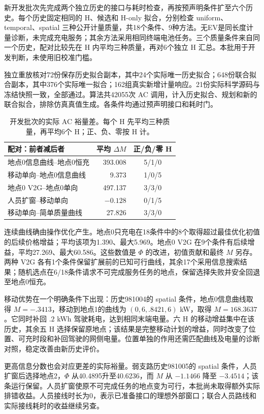 \documentclass[UTF8,fontset=fandol,11pt,a4paper]{ctexart}
\begin{document}
新开发批次先完成两个独立历史的接口与耗时检查，再按预声明条件扩至六个历史。每个历史固定相同的 H、候选和 H-only 拟合，分别检查 uniform、temporal、spatial 三种公开计量质量，共18个条件、9种方法。无EV是同长度计量诊断，未完成充电服务；其余方法采用相同终端电池任务。三个质量条件来自同一个历史，配对比较先在 H 内平均三种质量，再对6个独立 H 汇总。本批用于开发判断，未使用旧校准门槛。

独立重放核对72份保存历史拟合副本，其中24个实际唯一历史拟合；648份联合拟合副本，其中376个实际唯一拟合；162组真实新增计量响应。21份实际科学源码与冻结快照一致，全部通过。算法共42055次 AC 调用，计入历史拟合、规划和新的联合拟合，排除仿真真值生成。各条件均通过预声明接口和耗时门。

\begin{table}[htbp]
 \centering\small
 \caption{开发批次的实际 AC 裕量差。每个 H 先平均三种质量，再平均6个 H；正、负、零按 H 计。}
 \label{evf:development-pairs}
 \begin{tabular}{lrc}
  \toprule
  配对：前者减后者 & 平均 $\Delta M$ & 正/负/零 H\\
  \midrule
  地点0信息曲线--地点0恒充 & 393.008 & 5/1/0\\
  移动单向--地点0信息曲线 & 9.373 & 1/0/5\\
  地点0 V2G--地点0单向 & 497.137 & 3/3/0\\
  人员扩窗--移动单向 & $-0.128$ & 0/1/5\\
  移动单向--简单质量曲线 & 27.826 & 3/3/0\\
  \bottomrule
 \end{tabular}
\end{table}

连续曲线确由操作优化产生。地点0只充电在18条件中的8个取得超过最佳优化初值的后续价格增益；平均该项为1.390、最大5.969。地点0 V2G 在9个条件有后续增益，平均27.269、最大60.586。这些数值是 $\Phi$ 的改进，初值贡献和最终 $M$ 另存。两种 V2G 各有1个条件保留扩展前的已知可行曲线，其余17个采用信息搜索结果；随机选点在6/18条件请求不可完成服务任务的地点，保留选择失败并安全回退至地点0恒充。

移动优势在一个明确条件下出现：历史981004的 spatial 条件，地点0信息曲线取得 $M=-.3413$，移动到地点1的曲线为 $(0,6,.8421,6)$ kW，取得 $M=168.3637$。它同时补回 $.2$ kWh 驾驶耗电，达到相同末端电量。六 H 的移动增益集中在该历史，其余五 H 选择保留原地点；该结果是完整移动计划的增益，同时改变了位置、可充时段和补回驾驶的网侧电量。位置单独的作用还需匹配曲线及电量的诊断对照，稳定改善由新历史评价。

更高信息分数也会对应更差的实际裕量。弱支路历史981005的 spatial 条件，人员扩窗后选择地点2，$\Phi$ 从40.4895升至40.6236，而 $M$ 从 $-1.1466$ 降至 $-3.4514$；该条运行保留。人员扩窗使原不可完成任务的地点变为可行，本批尚未取得额外实际排错收益。人员接线时长为0，表示已准备接口的理想外部窗口；联合人员路线和实际接线耗时的收益继续另查。
\end{document}
